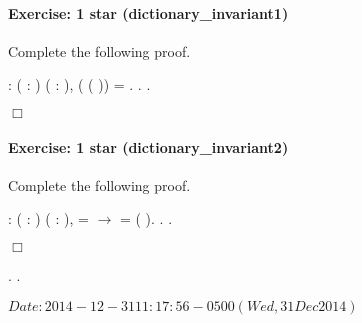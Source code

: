 \documentclass[12pt]{report}
\begin{document}
\paragraph{Exercise: 1 star (dictionary\_invariant1)}

 Complete the following proof. \begin{coqdoccode}
\coqdocemptyline
\coqdocnoindent
{}  : \coqdockw{\ensuremath{\forall}} ( : ) ( : ),\coqdoceol
\coqdocindent{1.00em}
(  (   )) =  .\coqdoceol
\coqdocnoindent
{}.\coqdoceol
 .\coqdoceol
\end{coqdoccode}
\ensuremath{\Box} 

\paragraph{Exercise: 1 star (dictionary\_invariant2)}

 Complete the following proof. \begin{coqdoccode}
\coqdocemptyline
\coqdocnoindent
{}  : \coqdockw{\ensuremath{\forall}} ( : ) (  : ),\coqdoceol
\coqdocindent{1.00em}
   =  \ensuremath{\rightarrow}    =   (   ).\coqdoceol
\coqdocnoindent
{}.\coqdoceol
 .\coqdoceol
\end{coqdoccode}
\ensuremath{\Box} \begin{coqdoccode}
\coqdocemptyline
\coqdocnoindent
{} .\coqdoceol
\coqdocemptyline
\coqdocnoindent
{} .\coqdoceol
\coqdocemptyline
\end{coqdoccode}
$Date: 2014-12-31 11:17:56 -0500 (Wed, 31 Dec 2014) $ \begin{coqdoccode}
\coqdocemptyline
\end{coqdoccode}

\begin{coqdoccode}
\end{coqdoccode}
\end{document}
